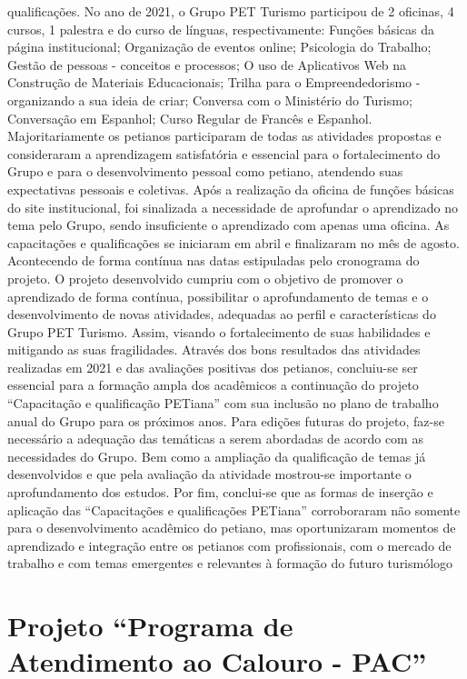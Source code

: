 qualificações. No ano de 2021, o Grupo PET Turismo participou de 2 oficinas, 4 cursos, 1 palestra 
e do curso de línguas, respectivamente: Funções básicas da página institucional; Organização de 
eventos online; Psicologia do Trabalho; Gestão de pessoas - conceitos e processos; O uso de 
Aplicativos Web na Construção de Materiais Educacionais; Trilha para o Empreendedorismo -
organizando a sua ideia de criar; Conversa com o Ministério do Turismo; Conversação em 
Espanhol; Curso Regular de Francês e Espanhol. Majoritariamente os petianos participaram de 
todas as atividades propostas e consideraram a aprendizagem satisfatória e essencial para o
fortalecimento do Grupo e para o desenvolvimento pessoal como petiano, atendendo suas 
expectativas pessoais e coletivas. Após a realização da oficina de funções básicas do site 
institucional, foi sinalizada a necessidade de aprofundar o aprendizado no tema pelo Grupo, sendo 
insuficiente o aprendizado com apenas uma oficina. As capacitações e qualificações se iniciaram 
em abril e finalizaram no mês de agosto. Acontecendo de forma contínua nas datas estipuladas
pelo cronograma do projeto. O projeto desenvolvido cumpriu com o objetivo de promover o
aprendizado de forma contínua, possibilitar o aprofundamento de temas e o desenvolvimento de 
novas atividades, adequadas ao perfil e características do Grupo PET Turismo. Assim, visando o 
fortalecimento de suas habilidades e mitigando as suas fragilidades. Através dos bons resultados 
das atividades realizadas em 2021 e das avaliações positivas dos petianos, concluiu-se ser essencial
para a formação ampla dos acadêmicos a continuação do projeto “Capacitação e qualificação 
PETiana” com sua inclusão no plano de trabalho anual do Grupo para os próximos anos. Para 
edições futuras do projeto, faz-se necessário a adequação das temáticas a serem abordadas de 
acordo com as necessidades do Grupo. Bem como a ampliação da qualificação de temas já 
desenvolvidos e que pela avaliação da atividade mostrou-se importante o aprofundamento dos 
estudos. Por fim, conclui-se que as formas de inserção e aplicação das “Capacitações e 
qualificações PETiana” corroboraram não somente para o desenvolvimento acadêmico do petiano, 
mas oportunizaram momentos de aprendizado e integração entre os petianos com profissionais, 
com o mercado de trabalho e com temas emergentes e relevantes à formação do futuro 
turismólogo



\section{Projeto “Programa de Atendimento ao Calouro - PAC”}


